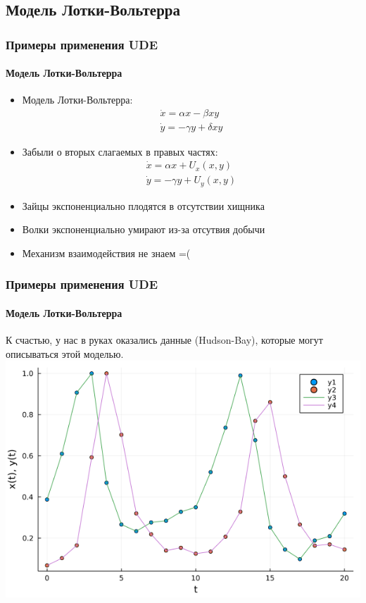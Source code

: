 \documentclass[10pt,pdf,hyperref={unicode}]{beamer}
\begin{document}
		\subsection{Модель Лотки-Вольтерра}
			
			\begin{frame}
				\frametitle{Примеры применения UDE} 
				\framesubtitle{Модель Лотки-Вольтерра}
					\begin{itemize}
						\item Модель Лотки-Вольтерра:
						\begin{displaymath}
							\begin{gathered}
							\dot{x} = \alpha x - \beta x y \\
							\dot{y} = -\gamma y + \delta x y
							\end{gathered}
						\end{displaymath}
						\item Забыли о вторых слагаемых в правых частях:
						\begin{displaymath}
						\begin{gathered}
							\dot{x} = \alpha x + U_x(x,y) \\
							\dot{y} = -\gamma y + U_y(x,y)
						\end{gathered}
						\end{displaymath}
						\item Зайцы экспоненциально плодятся в отсутствии хищника
						\item Волки экспоненциально умирают из-за отсутвия добычи
						\item Механизм взаимодействия не знаем =( 
					\end{itemize}
			\end{frame}
		
			\begin{frame}
				\frametitle{Примеры применения UDE} 
				\framesubtitle{Модель Лотки-Вольтерра}
				\begin{center}
					К счастью, у нас в руках оказались данные (Hudson-Bay), которые могут описываться этой моделью.
					\includegraphics[width=0.7\linewidth]{data.png}
				\end{center}
			\end{frame}
		
\end{document}
